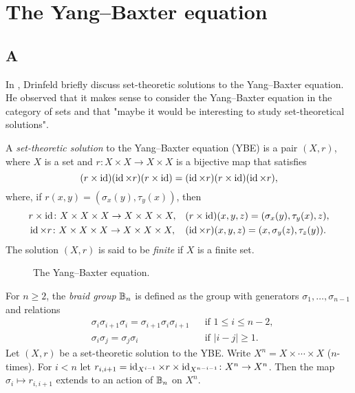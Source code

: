 \chapter{The Yang--Baxter equation}
\label{YB}

\section*{A}

In \cite{MR1183474}, Drinfeld briefly discuss set-theoretic solutions to the Yang--Baxter equation. 
He observed that
it makes sense to consider the Yang--Baxter equation in the category of sets and that 
"maybe it would be interesting to study set-theoretical solutions". 

\begin{definition}
A \emph{set-theoretic solution} to the Yang--Baxter equation (YBE) is a pair $(X,r)$, 
where $X$ is a set and $r\colon X\times X\to X\times X$ is a bijective map that satisfies 
\[
(r\times\operatorname{id})(\operatorname{id}\times r)(r\times\operatorname{id})=
(\operatorname{id}\times r)(r\times\operatorname{id})(\operatorname{id}\times r),
\]
where, if $r(x,y)=(\sigma_x(y),\tau_y(x))$, then 
\begin{align*}
& r\times\operatorname{id}\colon X\times X\times X\to X\times X\times X, &&(r\times\operatorname{id})(x,y,z)=(\sigma_x(y),\tau_y(x),z),\\
& \operatorname{id}\times r\colon X\times X\times X\to X\times X\times X, &&(\operatorname{id}\times r)(x,y,z)=(x,\sigma_y(z),\tau_z(y)).
\end{align*}
The solution $(X,r)$ is said to be \emph{finite} if $X$ is a finite set. 
\end{definition}

\begin{figure}
\centering
{}
\hspace{1cm}
\caption{The Yang--Baxter equation.}
\label{fig:braid}
\end{figure}

For $n\geq2$, the \emph{braid group} $\mathbb{B}_n$ is defined as the group with generators $\sigma_1,\dots,\sigma_{n-1}$ and relations
\begin{align*}
    &\sigma_i\sigma_{i+1}\sigma_i=\sigma_{i+1}\sigma_i\sigma_{i+1} && \text{if }1\leq i\leq n-2,\\
    &\sigma_i\sigma_j=\sigma_j\sigma_i && \text{if }|i-j|\geq 1.
\end{align*}
Let $(X,r)$ be a set-theoretic solution to the YBE. Write $X^n=X\times\cdots\times X$ ($n$-times).  
For $i<n$ let $r_{i,i+1}=\operatorname{id}_{X^{i-1}}\times r\times\operatorname{id}_{X^{n-i-1}}\colon X^n\to X^n$. Then the map $\sigma_i\mapsto r_{i,i+1}$ extends 
to an action of $\mathbb{B}_n$ on $X^n$.

